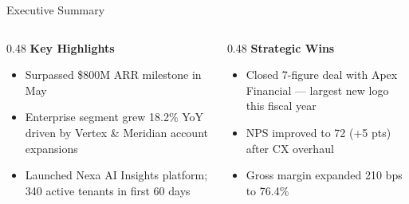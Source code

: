 \documentclass[11pt,aspectratio=169]{beamer}
\begin{document}
\begin{frame}{Executive Summary}
  \begin{columns}[T]
    \begin{column}{0.48\textwidth}
      \textbf{\color{nxnavy}Key Highlights}
      \begin{itemize}
        \setlength\itemsep{0.3em}
        \item Surpassed \$800M ARR milestone in May
        \item Enterprise segment grew 18.2\% YoY driven by Vertex \& Meridian account expansions
        \item Launched Nexa AI Insights platform; 340 active tenants in first 60 days
      \end{itemize}
    \end{column}
    \begin{column}{0.48\textwidth}
      \textbf{\color{nxnavy}Strategic Wins}
      \begin{itemize}
        \setlength\itemsep{0.3em}
        \item Closed 7-figure deal with Apex Financial — largest new logo this fiscal year
        \item NPS improved to 72 (+5 pts) after CX overhaul
        \item Gross margin expanded 210 bps to 76.4\%
      \end{itemize}
    \end{column}
  \end{columns}

\end{frame}
\end{document}
